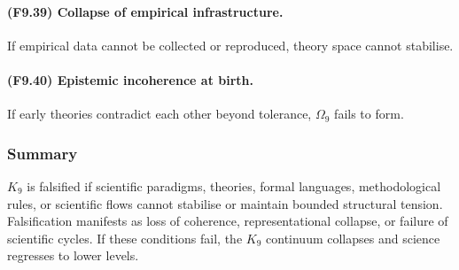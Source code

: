 \paragraph{(F9.39) Collapse of empirical infrastructure.}
If empirical data cannot be collected or reproduced,
theory space cannot stabilise.

\paragraph{(F9.40) Epistemic incoherence at birth.}
If early theories contradict each other beyond tolerance,
$\Omega_9$ fails to form.



\subsubsection{Summary}

$K_9$ is falsified if scientific paradigms, theories, formal languages,
methodological rules, or scientific flows cannot stabilise or maintain
bounded structural tension. Falsification manifests as loss of
coherence, representational collapse, or failure of scientific cycles.
If these conditions fail, the $K_9$ continuum collapses and science
regresses to lower levels.
